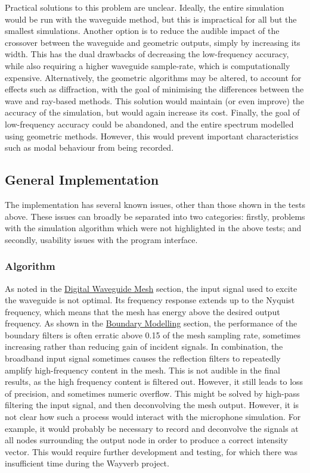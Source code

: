 \documentclass[]{scrreprt}
\begin{document}
Practical solutions to this problem are unclear. Ideally, the entire
simulation would be run with the waveguide method, but this is
impractical for all but the smallest simulations. Another option is to
reduce the audible impact of the crossover between the waveguide and
geometric outputs, simply by increasing its width. This has the dual
drawbacks of decreasing the low-frequency accuracy, while also requiring
a higher waveguide sample-rate, which is computationally expensive.
Alternatively, the geometric algorithms may be altered, to account for
effects such as diffraction, with the goal of minimising the differences
between the wave and ray-based methods. This solution would maintain (or
even improve) the accuracy of the simulation, but would again increase
its cost. Finally, the goal of low-frequency accuracy could be
abandoned, and the entire spectrum modelled using geometric methods.
However, this would prevent important characteristics such as modal
behaviour from being recorded.

\subsection{General Implementation}\label{general-implementation}

The implementation has several known issues, other than those shown in
the tests above. These issues can broadly be separated into two
categories: firstly, problems with the simulation algorithm which were
not highlighted in the above tests; and secondly, usability issues with
the program interface.

\subsubsection{Algorithm}\label{algorithm}

As noted in the
\href{\%7B\%7B\%20site.baseurl\%20\%7D\%7D\%7B\%\%20link\%20waveguide.md\%20\%\%7D}{Digital
Waveguide Mesh} section, the input signal used to excite the waveguide
is not optimal. Its frequency response extends up to the Nyquist
frequency, which means that the mesh has energy above the desired output
frequency. As shown in the
\href{\%7B\%7B\%20site.baseurl\%20\%7D\%7D\%7B\%\%20link\%20boundary.md\%20\%\%7D}{Boundary
Modelling} section, the performance of the boundary filters is often
erratic above 0.15 of the mesh sampling rate, sometimes increasing
rather than reducing gain of incident signals. In combination, the
broadband input signal sometimes causes the reflection filters to
repeatedly amplify high-frequency content in the mesh. This is not
audible in the final results, as the high frequency content is filtered
out. However, it still leads to loss of precision, and sometimes numeric
overflow. This might be solved by high-pass filtering the input signal,
and then deconvolving the mesh output. However, it is not clear how such
a process would interact with the microphone simulation. For example, it
would probably be necessary to record and deconvolve the signals at all
nodes surrounding the output node in order to produce a correct
intensity vector. This would require further development and testing,
for which there was insufficient time during the Wayverb project.
\end{document}
